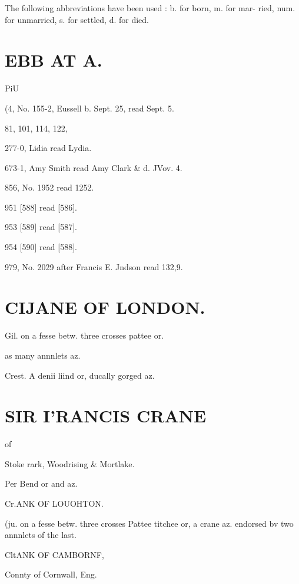 The following abbreviations have been used : b. for born, m. for mar- 
ried, num. for unmarried, s. for settled, d. for died. 



\chapter{EBB AT A.}


PiU 



(4, No. 155-2, Eussell b. Sept. 25, read Sept. 5. 



81, 
101, 
114, 
122, 



277-0, Lidia read Lydia. 

673-1, Amy Smith read Amy Clark \& d. JVov. 4. 

856, No. 1952 read 1252. 

951 [588] read [586]. 

953 [589] read [587]. 

954 [590] read [588]. 

979, No. 2029 after Francis E. Jndson read 132,9. 





\chapter{CIJANE OF LONDON.}
Gil. on a fesse betw. three crosses pattee or. 

as many annnlets az. 

Crest. A denii liind or, ducally gorged az. 



\chapter{SIR I'RANCIS CRANE}
of 

Stoke rark, Woodrising \& Mortlake. 

Per Bend or and az. 





Cr.ANK OF LOUOHTON. 

(ju. on a fesse betw. three crosses 
Pattee titchee or, a crane az. endorsed 
bv two annnlets of the last. 



CltANK OF CAMBORNF, 

Connty of Cornwall, Eng. 

